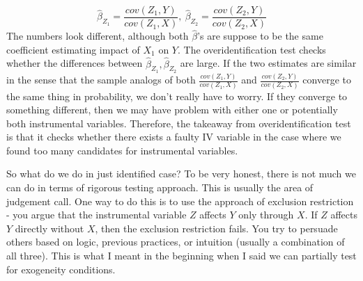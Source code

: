 \documentclass[12pt]{article}
\theoremstyle{definition}
\theoremstyle{property}
\theoremstyle{assumption}
\theoremstyle{example}
\theoremstyle{comment}
\begin{document}
\[
\hat{\beta}_{Z_1}=\frac{cov(Z_1,Y)}{cov(Z_1,X)}, \ \hat{\beta}_{Z_2}=\frac{cov(Z_2,Y)}{cov(Z_2,X)}
\]
The numbers look different, although both $\hat{\beta}$'s are suppose to be the same coefficient estimating impact of $X_1$ on $Y$. The overidentification test checks whether the differences between $\hat{\beta}_{Z_1}, \hat{\beta}_{Z_2}$ are large. If the two estimates are similar in the sense that the sample analogs of both $\frac{cov(Z_1,Y)}{cov(Z_1,X)}$ and $\frac{cov(Z_2,Y)}{cov(Z_2,X)}$ converge to the same thing in probability, we don't really have to worry. If they converge to something different, then we may have problem with either one or potentially both instrumental variables. Therefore, the takeaway from overidentification test is that it checks whether there exists a faulty IV variable in the case where we found too many candidates for instrumental variables. 
\par
So what do we do in just identified case? To be very honest, there is not much we can do in terms of rigorous testing approach. This is usually the area of judgement call. One way to do this is to use the approach of exclusion restriction - you argue that the instrumental variable $Z$ affects $Y$ only through $X$. If $Z$ affects $Y$ directly without $X$, then the exclusion restriction fails. You try to persuade others based on logic, previous practices, or intuition (usually a combination of all three). This is what I meant in the beginning when I said we can partially test for exogeneity conditions. 

\end{document}
